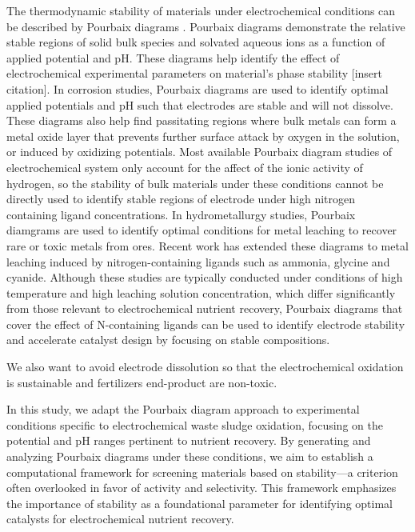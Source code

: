 \documentclass[journal=jacsat,manuscript=article]{achemso}
\begin{document}

The thermodynamic stability of materials under electrochemical conditions can be described by Pourbaix diagrams \cite{PourbaixAtlasSolutions}. Pourbaix diagrams demonstrate the relative stable regions of solid bulk species and solvated aqueous ions as a function of applied potential and pH. These diagrams help identify the effect of electrochemical experimental parameters on material's phase stability [insert citation]. In corrosion studies, Pourbaix diagrams are used to identify optimal applied potentials and pH such that electrodes are stable and will not dissolve. These diagrams also help find passitating regions where bulk metals can form a metal oxide layer that prevents further surface attack by oxygen in the solution, or induced by oxidizing potentials. Most available Pourbaix diagram studies of electrochemical system only account for the affect of the ionic activity of hydrogen, so the stability of bulk materials under these conditions cannot be directly used to identify stable regions of electrode under high nitrogen containing ligand concentrations. In hydrometallurgy studies, Pourbaix diamgrams are used to identify optimal conditions for metal leaching to recover rare or toxic metals from ores. Recent work has extended these diagrams to metal leaching induced by nitrogen-containing ligands such as ammonia\cite{Meng1996PrinciplesReview}, glycine and cyanide. Although these studies are typically conducted under conditions of high temperature and high leaching solution concentration, which differ significantly from those relevant to electrochemical nutrient recovery, Pourbaix diagrams that cover the effect of N-containing ligands can be used to identify electrode stability and accelerate catalyst design by focusing on stable compositions. 

We also want to avoid electrode dissolution so that the electrochemical oxidation is sustainable and fertilizers end-product are non-toxic. 

In this study, we adapt the Pourbaix diagram approach to experimental conditions specific to electrochemical waste sludge oxidation, focusing on the potential and pH ranges pertinent to nutrient recovery. By generating and analyzing Pourbaix diagrams under these conditions, we aim to establish a computational framework for screening materials based on stability—a criterion often overlooked in favor of activity and selectivity. This framework emphasizes the importance of stability as a foundational parameter for identifying optimal catalysts for electrochemical nutrient recovery.
\end{document}
